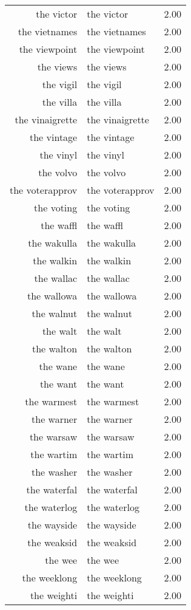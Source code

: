 \begin{table}[ht]
\begin{tabular}{rlr}
  the victor & the victor & 2.00 \\ 
  the vietnames & the vietnames & 2.00 \\ 
  the viewpoint & the viewpoint & 2.00 \\ 
  the views & the views & 2.00 \\ 
  the vigil & the vigil & 2.00 \\ 
  the villa & the villa & 2.00 \\ 
  the vinaigrette & the vinaigrette & 2.00 \\ 
  the vintage & the vintage & 2.00 \\ 
  the vinyl & the vinyl & 2.00 \\ 
  the volvo & the volvo & 2.00 \\ 
  the voterapprov & the voterapprov & 2.00 \\ 
  the voting & the voting & 2.00 \\ 
  the waffl & the waffl & 2.00 \\ 
  the wakulla & the wakulla & 2.00 \\ 
  the walkin & the walkin & 2.00 \\ 
  the wallac & the wallac & 2.00 \\ 
  the wallowa & the wallowa & 2.00 \\ 
  the walnut & the walnut & 2.00 \\ 
  the walt & the walt & 2.00 \\ 
  the walton & the walton & 2.00 \\ 
  the wane & the wane & 2.00 \\ 
  the want & the want & 2.00 \\ 
  the warmest & the warmest & 2.00 \\ 
  the warner & the warner & 2.00 \\ 
  the warsaw & the warsaw & 2.00 \\ 
  the wartim & the wartim & 2.00 \\ 
  the washer & the washer & 2.00 \\ 
  the waterfal & the waterfal & 2.00 \\ 
  the waterlog & the waterlog & 2.00 \\ 
  the wayside & the wayside & 2.00 \\ 
  the weaksid & the weaksid & 2.00 \\ 
  the wee & the wee & 2.00 \\ 
  the weeklong & the weeklong & 2.00 \\ 
  the weighti & the weighti & 2.00 \\ 

\end{tabular}
\end{table}
